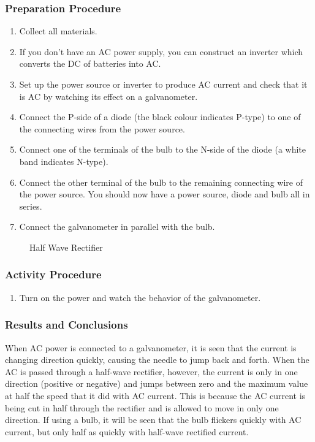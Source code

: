 \subsubsection*{Preparation Procedure}
\begin{enumerate}
\item{Collect all materials.}
\item{If you don't have an AC power supply, you can construct an inverter which converts the DC of batteries into AC.}
\item{Set up the power source or inverter to produce AC current and check that it is AC by watching its effect on a galvanometer.}
\item{Connect the P-side of a diode (the black colour indicates P-type) to one of the connecting wires from the power source.}
\item{Connect one of the terminals of the bulb to the N-side of the diode (a white band indicates N-type).}
\item{Connect the other terminal of the bulb to the remaining connecting wire of the power source.  You should now have a power source, diode and bulb all in series.}
\item{Connect the galvanometer in parallel with the bulb.}
\end{enumerate}

\begin{figure}
\begin{center}
\def\svgwidth{180pt}

\caption{Half Wave Rectifier}
\label{fig:half-wave-rectifier}
\end{center}
\end{figure}

\subsubsection*{Activity Procedure}
\begin{enumerate}
\item{Turn on the power and watch the behavior of the galvanometer.}
\end{enumerate}

\subsubsection*{Results and Conclusions}
When AC power is connected to a galvanometer, it is seen that the current is changing direction quickly, causing the needle to jump back and forth.  When the AC is passed through a half-wave rectifier, however, the current is only in one direction (positive or negative) and jumps between zero and the maximum value at half the speed that it did with AC current.
This is because the AC current is being cut in half through the rectifier and is allowed to move in only one direction.  If using a bulb, it will be seen that the bulb flickers quickly with AC current, but only half as quickly with half-wave rectified current.

